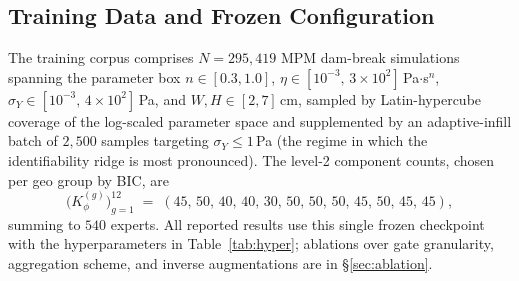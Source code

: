 \subsection{Training Data and Frozen Configuration}
\label{sec:data}

The training corpus comprises $N = 295{,}419$ MPM dam-break
simulations spanning the parameter box
$n \in [0.3, 1.0]$,
$\eta \in [10^{-3},\,3{\times}10^{2}]$\,Pa$\cdot$s$^{n}$,
$\sigma_Y \in [10^{-3},\,4{\times}10^{2}]$\,Pa, and
$W, H \in [2, 7]$\,cm, sampled by Latin-hypercube coverage of the
log-scaled parameter space and supplemented by an adaptive-infill
batch of $2{,}500$ samples targeting $\sigma_Y \le 1$\,Pa (the regime
in which the identifiability ridge is most pronounced). The level-2
component counts, chosen per geo group by BIC, are
\begin{equation*}
    \bigl(K_{\phi}^{(g)}\bigr)_{g=1}^{12}
    \;=\;
    (45,\,50,\,40,\,40,\,30,\,50,\,50,\,50,\,45,\,50,\,45,\,45),
\end{equation*}
summing to $540$ experts. All reported results use this single
frozen checkpoint with the hyperparameters in
Table~\ref{tab:hyper}; ablations over gate granularity, aggregation
scheme, and inverse augmentations are in \S\ref{sec:ablation}.

